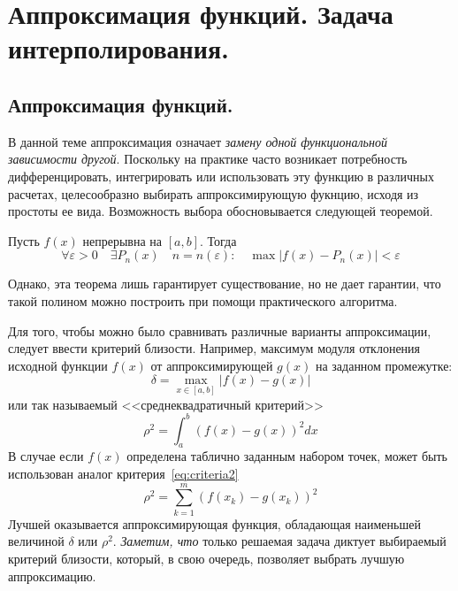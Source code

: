 \section{Аппроксимация функций. Задача интерполирования.}\label{sec:ch05}

\subsection{Аппроксимация функций.}
В данной теме аппроксимация означает \emph{замену одной функциональной зависимости
другой}. Поскольку на практике часто возникает потребность дифференцировать,
интегрировать или использовать эту функцию в различных расчетах, целесообразно
выбирать аппроксимирующую фукнцию, исходя из простоты ее вида. Возможность выбора
обосновывается следующей теоремой.
\begin{theorem}
    Пусть $f(x)$ непрерывна на $[a, b]$. Тогда
    \begin{equation*}
        \forall \varepsilon > 0 \quad \exists P_n(x) \quad n = n(\varepsilon) : \quad \max |f(x) - P_n(x)| < \varepsilon
    \end{equation*}
\end{theorem}
Однако, эта теорема лишь гарантирует существование, но не дает гарантии, что такой полином
можно построить при помощи практического алгоритма.

Для того, чтобы можно было сравнивать различные варианты аппроксимации, следует
ввести критерий близости. Например, максимум модуля отклонения исходной функции
$f(x)$ от аппроксимирующей $g(x)$ на заданном промежутке:
\begin{equation}
    \delta = \max_{x \in [a, b]} |f(x) - g(x)|\label{eq:criteria1}
\end{equation}
или так называемый <<среднеквадратичный критерий>>
\begin{equation}
    \rho^2 = \int_a^b \left( f(x) - g(x) \right)^2 dx\label{eq:criteria2}
\end{equation}
В случае если $f(x)$ определена таблично заданным набором точек, может быть использован
аналог критерия~\eqref{eq:criteria2}
\begin{equation}
    \rho^2 = \sum_{k=1}^m \left( f(x_k) - g(x_k) \right)^2\label{eq:criteria3}
\end{equation}
Лучшей оказывается аппроксимирующая функция, обладающая наименьшей величиной $\delta$ или $\rho^2$.
\emph{Заметим, что} только решаемая задача диктует выбираемый критерий близости, который, в свою очередь,
позволяет выбрать лучшую аппроксимацию.

